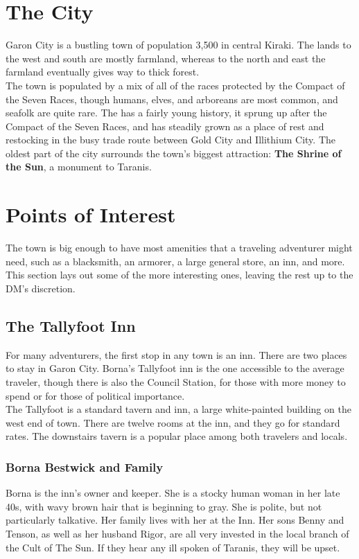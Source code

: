 \section{The City}
Garon City is a bustling town of population 3,500 in central Kiraki. The lands to the west and south are mostly farmland, whereas to the north and east the farmland eventually gives way to thick forest.\\
The town is populated by a mix of all of the races protected by the Compact of the Seven Races, though humans, elves, and arboreans are most common, and seafolk are quite rare. The has a fairly young history, it sprung up after the Compact of the Seven Races, and has steadily grown as a place of rest and restocking in the busy trade route between Gold City and Illithium City. The oldest part of the city surrounds the town's biggest attraction: \textbf{The Shrine of the Sun}, a monument to Taranis. \\
\section{Points of Interest}
The town is big enough to have most amenities that a traveling adventurer might need, such as a blacksmith, an armorer, a large general store, an inn, and more. This section lays out some of the more interesting ones, leaving the rest up to the DM's discretion.
\subsection{The Tallyfoot Inn}
For many adventurers, the first stop in any town is an inn. There are two places to stay in Garon City. Borna's Tallyfoot inn is the one accessible to the average traveler, though there is also the Council Station, for those with more money to spend or for those of political importance.\\
The Tallyfoot is a standard tavern and inn, a large white-painted building on the west end of town. There are twelve rooms at the inn, and they go for standard rates. The downstairs tavern is a popular place among both travelers and locals. 
\subsubsection{Borna Bestwick and Family}
Borna is the inn's owner and keeper. She is a stocky human woman in her late 40s, with wavy brown hair that is beginning to gray. She is polite, but not particularly talkative. Her family lives with her at the Inn. Her sons Benny and Tenson, as well as her husband Rigor, are all very invested in the local branch of the Cult of The Sun. If they hear any ill spoken of Taranis, they will be upset.
